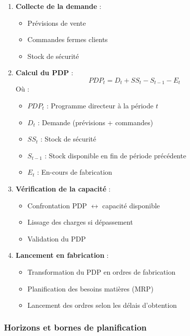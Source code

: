 \documentclass{article}
\begin{document}
\begin{enumerate}
    \item \textbf{Collecte de la demande} :
    \begin{itemize}
        \item Prévisions de vente
        \item Commandes fermes clients
        \item Stock de sécurité
    \end{itemize}
    
    \item \textbf{Calcul du PDP} :
    \[
    PDP_t = D_t + SS_t - S_{t-1} - E_t
    \]
    Où :
    \begin{itemize}
        \item $PDP_t$ : Programme directeur à la période $t$
        \item $D_t$ : Demande (prévisions + commandes)
        \item $SS_t$ : Stock de sécurité
        \item $S_{t-1}$ : Stock disponible en fin de période précédente
        \item $E_t$ : En-cours de fabrication
    \end{itemize}
    
    \item \textbf{Vérification de la capacité} :
    \begin{itemize}
        \item Confrontation PDP $\leftrightarrow$ capacité disponible
        \item Lissage des charges si dépassement
        \item Validation du PDP
    \end{itemize}
    
    \item \textbf{Lancement en fabrication} :
    \begin{itemize}
        \item Transformation du PDP en ordres de fabrication
        \item Planification des besoins matières (MRP)
        \item Lancement des ordres selon les délais d'obtention
    \end{itemize}
\end{enumerate}

\subsubsection{Horizons et bornes de planification}
\end{document}
